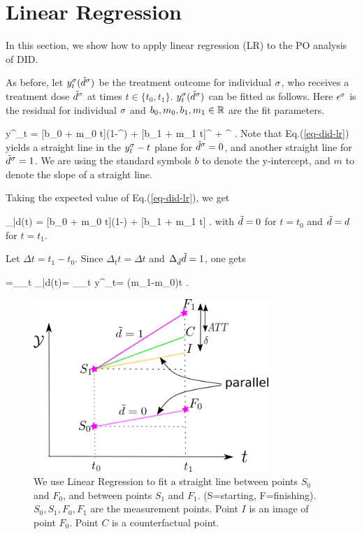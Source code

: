 \section{Linear Regression}
In this
section,
we show how to apply
linear regression (LR)
to the PO analysis of DID.


As before, let
$y^\sigma_t({\tilde{d}}^\sigma)$ be the treatment outcome
for individual $\sigma$,
who receives
a treatment dose
${\tilde{d}}^\sigma$
at times $t\in\{t_0, t_1\}$.
$y^\sigma_t({\tilde{d}}^\sigma)$
can be fitted as follows.
Here $\epsilon^\sigma$
is the residual
for individual $\sigma$
and $b_0, m_0, b_1, m_1\in { \mathbb{R}}$
are the fit parameters.

%
\beq
y^\s_t = [b_0 + m_0 t](1-\td^\s)
+  [b_1 + m_1 t]\td^\s
+ \eps^\s
\;.
\label{eq-did-lr}
\eeq  
Note that Eq.(\ref{eq-did-lr})
 yields a straight line
in the $y^\sigma_t-t$ plane
for ${\tilde{d}}^\sigma=0$,
and another 
straight line for ${\tilde{d}}^\sigma=1$.
We are
using the
standard symbols
$b$ to denote
the y-intercept, and $m$ 
to denote the slope
of a straight line.

Taking the expected value
of Eq.(\ref{eq-did-lr}), we get

\beq
\caly_{\td|d}(t) = 
[b_0 + m_0 t](1-\td)
+  [b_1 + m_1 t]\td
\;.
\eeq  
with ${\tilde{d}}=0$ for $t=t_0$
and ${\tilde{d}}=d$ for $t=t_1$.

Let $\Delta t=t_1-t_0$. Since
$\Delta_t t=\Delta t$ and 
$\Delta_{\tilde{d}} {\tilde{d}}=1$, one gets

\beq
\delta=\Delta_\td\Delta_t 
\calm\caly_{\td|d}(t)=
\Delta_\td\Delta_t y^\s_t=
(m_1-m_0)\Delta t
\;.
\eeq



\begin{figure}[h!]
\centering
\includegraphics[width=3.5in]
{did/parallel-trends.png}
\caption{We use
Linear Regression
to fit a straight line
between points $S_0$
and $F_0$,
and between points
$S_1$ and $F_1$.
(S=starting, F=finishing).
$S_0, S_1, F_0, F_1$ are the measurement points.
Point
$I$ is an image of point $F_0$.
Point $C$ is a counterfactual point.
} 
\label{fig-parallel-trends}
\end{figure}

